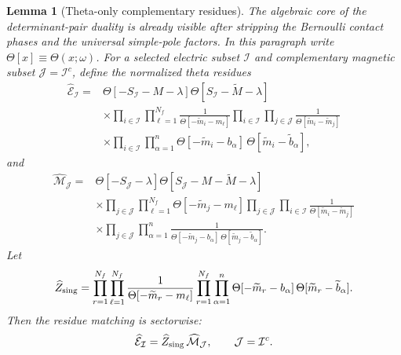 \documentclass[11pt,a4paper]{article}
\numberwithin{equation}{section}
\theoremstyle{plain}
\newtheorem{lemma}[theorem]{Lemma}
\theoremstyle{definition}
\theoremstyle{remark}
\begin{document}
\begin{lemma}[Theta-only complementary residues]
\label{lem:theta-only-complementary-residues}
The algebraic core of the determinant-pair duality is already visible after stripping the Bernoulli contact phases and the universal simple-pole factors.  In this paragraph write \(\Theta[x]\equiv\Theta(x;\omega)\).  For a selected electric subset \(\mathcal I\) and complementary magnetic subset \(\mathcal J=\mathcal I^c\), define the normalized theta residues
\begin{align}
\widehat{\mathcal E}_{\mathcal I}
={}&
\Theta[-S_{\mathcal I}-M-\lambda]
\Theta[S_{\mathcal I}-\widetilde M-\lambda]
\nonumber\\
&\times
\prod_{i\in\mathcal I}\prod_{\ell=1}^{N_f}
\frac{1}{\Theta[-\widetilde m_i-m_\ell]}
\prod_{i\in\mathcal I}\prod_{j\in\mathcal J}
\frac{1}{\Theta[\widetilde m_i-\widetilde m_j]}
\nonumber\\
&\times
\prod_{i\in\mathcal I}\prod_{\alpha=1}^{n}
\Theta[-\widetilde m_i-b_\alpha]\,
\Theta[\widetilde m_i-\widetilde b_\alpha],
\label{eq:theta-only-electric-sector-main}
\end{align}
and
\begin{align}
\widehat{\mathcal M}_{\mathcal J}
={}&
\Theta[-S_{\mathcal J}-\lambda]
\Theta[S_{\mathcal J}-M-\widetilde M-\lambda]
\nonumber\\
&\times
\prod_{j\in\mathcal J}\prod_{\ell=1}^{N_f}
\Theta[-\widetilde m_j-m_\ell]
\prod_{j\in\mathcal J}\prod_{i\in\mathcal I}
\frac{1}{\Theta[\widetilde m_i-\widetilde m_j]}
\nonumber\\
&\times
\prod_{j\in\mathcal J}\prod_{\alpha=1}^{n}
\frac{1}{\Theta[-\widetilde m_j-b_\alpha]\,
\Theta[\widetilde m_j-\widetilde b_\alpha]}.
\label{eq:theta-only-magnetic-sector-main}
\end{align}
Let
\begin{equation}
\widehat Z_{\rm sing}=
\prod_{r=1}^{N_f}\prod_{\ell=1}^{N_f}
\frac{1}{\Theta[-\widetilde m_r-m_\ell]}
\prod_{r=1}^{N_f}\prod_{\alpha=1}^{n}
\Theta[-\widetilde m_r-b_\alpha]\,
\Theta[\widetilde m_r-\widetilde b_\alpha].
\label{eq:theta-only-singlet-main}
\end{equation}
Then the residue matching is sectorwise:
\begin{equation}
\widehat{\mathcal E}_{\mathcal I}
=
\widehat Z_{\rm sing}\,
\widehat{\mathcal M}_{\mathcal J},
\qquad
\mathcal J=\mathcal I^c .
\label{eq:theta-only-sectorwise-main}
\end{equation}
\end{lemma}
\end{document}
